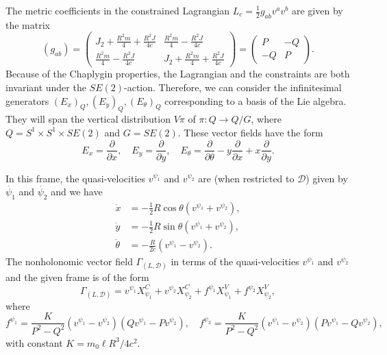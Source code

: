 \documentclass[11pt]{article}
\def\fpd#1#2{{\displaystyle\frac{\partial #1}{\partial #2}}}
\def\D{{\mathcal D}}
\begin{document}
The metric coefficients in the constrained Lagrangian $L_c=\frac{1}{2}g_{ab}v^a v^b$ are given by the matrix $$(g_{ab})=\begin{pmatrix}
   J_2+\frac{R^2m}{4}+\frac{R^2J}{4c}&\frac{R^2 m}{4}-\frac{R^2 J}{4c}\\[2mm]\frac{R^2 m}{4}-\frac{R^2 J}{4c}& J_2+\frac{R^2m}{4}+\frac{R^2J}{4c}
\end{pmatrix}=\begin{pmatrix}
    P&-Q\\[2mm]-Q&P
\end{pmatrix}.$$
Because of the Chaplygin properties, the  Lagrangian and the constraints are both invariant under the $SE(2)$-action. Therefore, we can consider the infinitesimal generators $(E_x)_Q,(E_y)_Q,(E_{\theta})_Q$ corresponding to a basis of the Lie algebra. They will span  the vertical distribution $V\pi$ of $\pi:Q\rightarrow Q/G$, where $Q=S^1 \times S^1 \times
SE(2)$ and $G=SE(2)$. These vector fields have the form 
\[
{E}_x=\fpd{}{x}, \quad
{E}_y=\fpd{}{y}, \quad
{E}_{\theta}=\fpd{}{\theta} - y \fpd{}{x} + x\fpd{}{y}.
\]


In this frame, the quasi-velocities $v^{\psi_1}$ and $v^{\psi_2}$ are (when restricted to $\D$) given by $\dot{\psi_{1}}$ and $\dot{\psi_2}$  and  we have 
\begin{align*}
\dot{x}&=-\frac{1}{2} R\cos\theta(v^{\psi_1}+v^{\psi_2}),\\
\dot{y}&=-\frac{1}{2} R\sin\theta(v^{\psi_1}+v^{\psi_2}),\\
\dot{\theta}&=-\frac{R}{2c}(v^{\psi_1}-v^{\psi_2}).
\end{align*}
The nonholonomic vector field $\Gamma_{(L,\mathcal{D})}$ in terms of the quasi-velocities $v^{\psi_1}$ and $v^{\psi_2}$ and the given frame   is of the form
$$\Gamma_{(L,\mathcal{D})}= v^{\psi_1}X_{\psi_1}^ C+v^{\psi_2}X_{\psi_2}^C+f^{\psi_1} X_{\psi_1}^V+f^{\psi_2} X_{\psi_2}^V,$$
where \[
f^{\psi_1}=\frac{K}{P^2-Q^2}(v^{\psi_1}-v^{\psi_2})(Qv^{\psi_1}-Pv^{\psi_2}),\quad
f^{\psi_2}=\frac{K}{P^2-Q^2}(v^{\psi_1}-v^{\psi_2})(Pv^{\psi_1}-Qv^{\psi_2}),
\]
with constant $K=m_0 \ell R^3/4c^2$.
\end{document}
